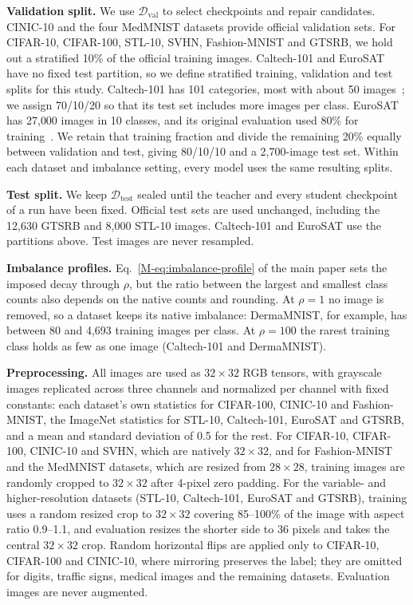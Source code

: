 \documentclass[10pt,journal,compsoc]{IEEEtran}
\theoremstyle{definition}
\begin{document}
\textbf{Validation split.} We use $\mathcal{D}_{\mathrm{val}}$ to select
checkpoints and repair candidates. CINIC-10 and the four MedMNIST
datasets provide official validation sets. For CIFAR-10, CIFAR-100,
STL-10, SVHN, Fashion-MNIST and GTSRB, we hold out a stratified 10\% of
the official training images. Caltech-101 and EuroSAT have no fixed
test partition, so we define stratified training, validation and test
splits for this study. Caltech-101 has 101 categories, most with about
50 images~\cite{feifei2004learning}; we assign 70/10/20 so that
its test set includes more images per class. EuroSAT has 27{,}000
images in 10 classes, and its original evaluation used 80\% for
training~\cite{helber2019eurosat}. We retain that training fraction
and divide the remaining 20\% equally between validation and test,
giving 80/10/10 and a 2{,}700-image test set. Within each dataset and
imbalance setting, every model uses the same resulting splits.

\textbf{Test split.} We keep $\mathcal{D}_{\mathrm{test}}$ sealed until
the teacher and every student checkpoint of a run have been fixed.
Official test sets are used unchanged, including the 12{,}630 GTSRB
and 8{,}000 STL-10 images. Caltech-101 and EuroSAT use
the partitions above. Test images are never resampled.

\textbf{Imbalance profiles.} Eq.~\eqref{M-eq:imbalance-profile} of the
main paper sets the imposed decay through $\rho$, but the ratio between
the largest and smallest class counts also depends on the native counts
and rounding. At $\rho=1$ no image is removed, so a dataset keeps its
native imbalance: DermaMNIST, for example, has between 80 and 4{,}693
training images per class. At $\rho=100$ the rarest training class holds
as few as one image (Caltech-101 and DermaMNIST).

\textbf{Preprocessing.} All images are used as $32\times32$ RGB tensors,
with grayscale images replicated across three channels and normalized per
channel with fixed constants: each dataset's own statistics for
CIFAR-100, CINIC-10 and Fashion-MNIST, the ImageNet statistics for
STL-10, Caltech-101, EuroSAT and GTSRB, and a mean and standard
deviation of 0.5 for the rest. For CIFAR-10, CIFAR-100,
CINIC-10 and SVHN, which are natively $32\times32$, and for Fashion-MNIST
and the MedMNIST datasets, which are resized from $28\times28$, training
images are randomly cropped to $32\times32$ after 4-pixel zero padding.
For the variable- and higher-resolution datasets (STL-10, Caltech-101,
EuroSAT and GTSRB), training uses a random resized crop to $32\times32$
covering 85--100\% of the image with aspect ratio 0.9--1.1, and
evaluation resizes the shorter side to 36 pixels and takes the central
$32\times32$ crop. Random horizontal flips are applied only to CIFAR-10,
CIFAR-100 and CINIC-10, where mirroring preserves the label; they are
omitted for digits, traffic signs, medical images and the remaining
datasets. Evaluation images are never augmented.
\end{document}
